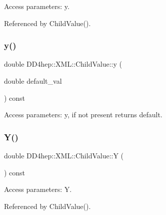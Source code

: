 Access parameters\+: y. 



Referenced by Child\+Value().

\hypertarget{struct_d_d4hep_1_1_x_m_l_1_1_child_value_afcb80ed7c8054635bc80cb0c64695504}{}\label{struct_d_d4hep_1_1_x_m_l_1_1_child_value_afcb80ed7c8054635bc80cb0c64695504} 
\subsubsection{\texorpdfstring{y()}{y()}\hspace{0.1cm}{\footnotesize\ttfamily [2/2]}}
{\footnotesize\ttfamily double D\+D4hep\+::\+X\+M\+L\+::\+Child\+Value\+::y (\begin{DoxyParamCaption}\item[{double}]{default\+\_\+val }\end{DoxyParamCaption}) const}



Access parameters\+: y, if not present returns default. 

\hypertarget{struct_d_d4hep_1_1_x_m_l_1_1_child_value_a9631b12c7e3c614df092a9f0d5b06aa3}{}\label{struct_d_d4hep_1_1_x_m_l_1_1_child_value_a9631b12c7e3c614df092a9f0d5b06aa3} 
\subsubsection{\texorpdfstring{Y()}{Y()}}
{\footnotesize\ttfamily double D\+D4hep\+::\+X\+M\+L\+::\+Child\+Value\+::Y (\begin{DoxyParamCaption}{ }\end{DoxyParamCaption}) const}



Access parameters\+: Y. 



Referenced by Child\+Value().

\hypertarget{struct_d_d4hep_1_1_x_m_l_1_1_child_value_a904e9922ce31589f22a3050566a240da}{}\label{struct_d_d4hep_1_1_x_m_l_1_1_child_value_a904e9922ce31589f22a3050566a240da} 
